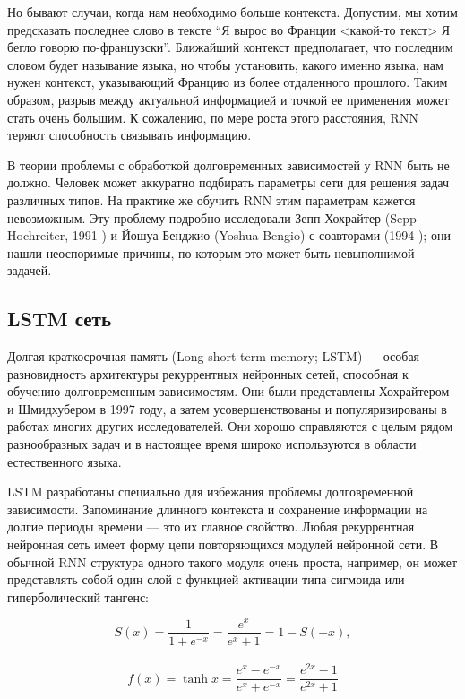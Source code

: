 \documentclass[14pt]{extarticle}
\begin{document}
Но бывают случаи, когда нам необходимо больше контекста. Допустим, мы хотим предсказать последнее слово в тексте “Я вырос во Франции <какой-то текст> Я бегло говорю по-французски”. Ближайший контекст предполагает, что последним словом будет называние языка, но чтобы установить, какого именно языка, нам нужен контекст, указывающий Францию из более отдаленного прошлого. Таким образом, разрыв между актуальной информацией и точкой ее применения может стать очень большим. К сожалению, по мере роста этого расстояния, RNN теряют способность связывать информацию.

В теории проблемы с обработкой долговременных зависимостей у RNN быть не должно. Человек может аккуратно подбирать параметры сети для решения задач различных типов. На практике же обучить RNN этим параметрам кажется невозможным. Эту проблему подробно исследовали Зепп Хохрайтер (Sepp Hochreiter, 1991 \cite{sutton_book}) и Йошуа Бенджио (Yoshua Bengio) с соавторами (1994 \cite{sutton_book}); они нашли неоспоримые причины, по которым это может быть невыполнимой задачей.

\subsection{LSTM сеть}

Долгая краткосрочная память (Long short-term memory; LSTM) --- особая разновидность архитектуры рекуррентных нейронных сетей, способная к обучению долговременным зависимостям. Они были представлены Хохрайтером и Шмидхубером в 1997 \cite{sutton_book} году, а затем усовершенствованы и популяризированы в работах многих других исследователей. Они хорошо справляются с целым рядом разнообразных задач и в настоящее время широко используются в области естественного языка.

LSTM разработаны специально для избежания проблемы долговременной зависимости. Запоминание длинного контекста и сохранение информации на долгие периоды времени --- это их главное свойство. Любая рекуррентная нейронная сеть имеет форму цепи повторяющихся модулей нейронной сети. В обычной RNN структура одного такого модуля очень проста, например, он может представлять собой один слой с функцией активации типа сигмоида или гиперболический тангенс:

$$S(x) = \frac{1}{1 + e^{-x}} = \frac{e^{x}}{e^{x} + 1} = 1 - S(-x),$$ \\
$$f(x) = \tanh{x} = \frac{e^{x} - e^{-x}}{e^{x} + e^{-x}} = \frac{e^{2x} - 1}{e^{2x} + 1}$$
\end{document}
